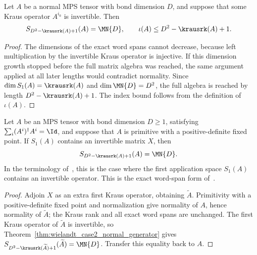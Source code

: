 \begin{theorem}%
    \label{thm:wielandt_case2_normal_generator}
    \leanok
    Let $A$ be a normal MPS tensor with bond dimension $D$, and suppose
    that some Kraus operator $A^{i_0}$ is invertible. Then
    \[
        S_{D^2 - \krausrk(A) + 1}(A)=\MN{D},
        \qquad
        \iota(A) \le D^2 - \krausrk(A) + 1.
    \]
\end{theorem}

\begin{proof}
    \leanok
    The dimensions of the exact word spans cannot decrease, because
    left multiplication by the invertible Kraus operator is injective.
    If this dimension growth stopped before the full matrix algebra was
    reached, the same argument applied at all later lengths would
    contradict normality. Since $\dim S_1(A)=\krausrk(A)$ and
    $\dim \MN{D}=D^2$, the full algebra is reached by
    length $D^2 - \krausrk(A) + 1$. The index bound follows from the
    definition of $\iota(A)$.
\end{proof}

\begin{theorem}%
    \label{thm:wielandt_case2_one_step_span}
    \leanok
    Let $A$ be an MPS tensor with bond dimension $D \ge 1$, satisfying
    $\sum_i (A^i)^\dagger A^i=\Id$, and suppose that $A$ is primitive
    with a positive-definite fixed point. If $S_1(A)$ contains an
    invertible matrix $X$, then
    \begin{equation}\label{eq:wld_case2_one_step_wordspan_top}
        S_{D^2 - \krausrk(A) + 1}(A)=\MN{D}.
    \end{equation}
    In the terminology of~\cite{Sanz2010Quantum}, this is the case where
    the first application space $S_1(A)$ contains an invertible operator.
    This is the exact word-span form of~\cite[Theorem~1, case~(2)]{Sanz2010Quantum}.
\end{theorem}

\begin{proof}
    \leanok
    Adjoin $X$ as an extra first Kraus operator, obtaining
    $\widetilde A$. Primitivity with a positive-definite fixed point and
    normalization give normality of $A$, hence normality of $\widetilde A$;
    the Kraus rank and all exact word spans are unchanged. The first Kraus operator of
    $\widetilde A$ is invertible, so
    Theorem~\ref{thm:wielandt_case2_normal_generator} gives
    $S_{D^2 - \krausrk(\widetilde A) + 1}(\widetilde A)=\MN{D}$.
    Transfer this equality back to $A$.
\end{proof}

